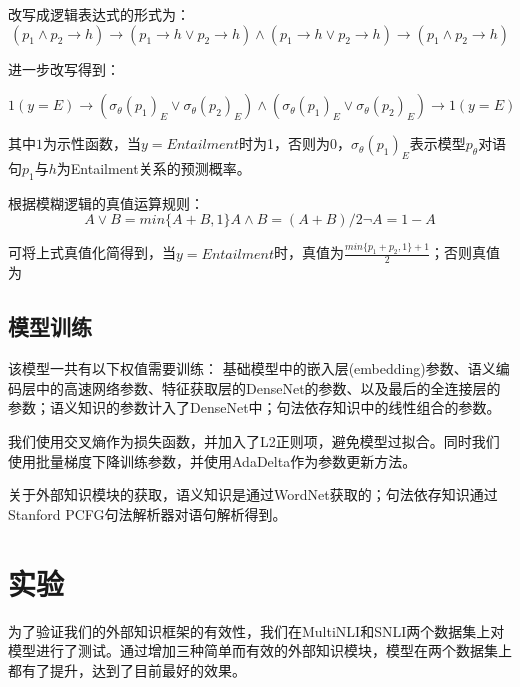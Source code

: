 \documentclass[UTF8,11pt,a4paper,nofonts]{ctexart}
\begin{document}
改写成逻辑表达式的形式为：
\begin{equation}
 (p_1 \land p_2 \to h) \to (p_1 \to h \vee p_2 \to h) \land (p_1 \to h \vee p_2 \to h) \to (p_1 \land p_2 \to h)
\end{equation}

进一步改写得到：

\begin{equation}
1(y=E) \to (\sigma_\theta(p_1)_E \vee \sigma_\theta(p_2)_E) \land (\sigma_\theta(p_1)_E \vee \sigma_\theta(p_2)_E) \to 1(y=E)
\end{equation}

其中$1$为示性函数，当$y=Entailment$时为1，否则为0，$\sigma_\theta(p_1)_E$表示模型$p_\theta$对语句$p_1$与$h$为Entailment关系的预测概率。

根据模糊逻辑的真值运算规则：
\begin{equation}
A \vee B = min\{A+B,1\}

A \land B = (A + B) / 2

\neg A = 1 - A

\end{equation}

可将上式真值化简得到，当$y=Entailment$时，真值为$\frac{min\{p_1+p_2,1\}+1}{2}$；否则真值为

\subsection{模型训练}


该模型一共有以下权值需要训练：
基础模型中的嵌入层(embedding)参数、语义编码层中的高速网络参数、特征获取层的DenseNet的参数、以及最后的全连接层的参数；语义知识的参数计入了DenseNet中；句法依存知识中的线性组合的参数。

我们使用交叉熵作为损失函数，并加入了L2正则项，避免模型过拟合。同时我们使用批量梯度下降训练参数，并使用AdaDelta\cite{}作为参数更新方法。

关于外部知识模块的获取，语义知识是通过WordNet获取的；句法依存知识通过Stanford PCFG句法解析器对语句解析得到。



\section{实验}
为了验证我们的外部知识框架的有效性，我们在MultiNLI和SNLI两个数据集上对模型进行了测试。通过增加三种简单而有效的外部知识模块，模型在两个数据集上都有了提升，达到了目前最好的效果。
\end{document}
